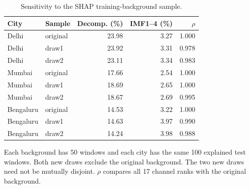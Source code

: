 \begin{table}[!htbp]
\centering
\caption{Sensitivity to the SHAP training-background sample.}\label{tab:background}
\setlength{\tabcolsep}{4pt}
\begin{tabular}{llrrr}
\toprule
City & Sample & Decomp. (\%) & IMF1--4 (\%) & $\rho$ \\
\midrule
Delhi & original & 23.98 & 3.27 & 1.000 \\
Delhi & draw1 & 23.92 & 3.31 & 0.978 \\
Delhi & draw2 & 23.11 & 3.34 & 0.983 \\
Mumbai & original & 17.66 & 2.54 & 1.000 \\
Mumbai & draw1 & 18.69 & 2.65 & 1.000 \\
Mumbai & draw2 & 18.67 & 2.69 & 0.995 \\
Bengaluru & original & 14.53 & 3.22 & 1.000 \\
Bengaluru & draw1 & 14.63 & 3.97 & 0.990 \\
Bengaluru & draw2 & 14.24 & 3.98 & 0.988 \\
\bottomrule
\end{tabular}
\par\smallskip\begin{minipage}{0.98\linewidth}\footnotesize Each background has 50 windows and each city has the same 100 explained test windows. Both new draws exclude the original background. The two new draws need not be mutually disjoint. $\rho$ compares all 17 channel ranks with the original background.\end{minipage}
\end{table}
